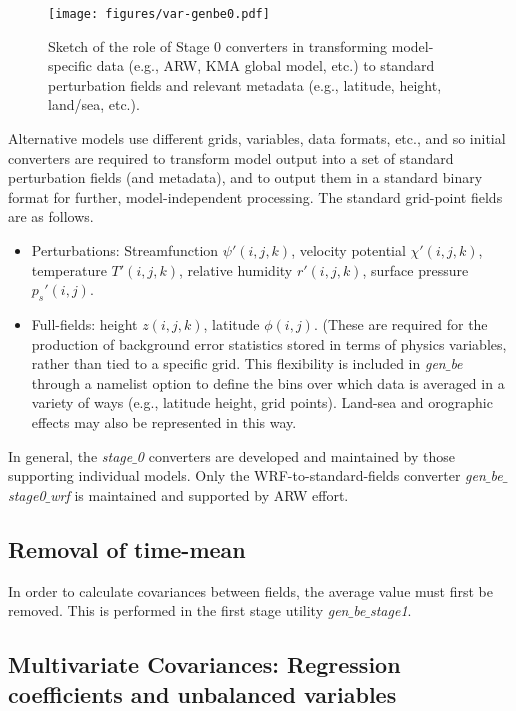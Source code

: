 %
%
\begin{figure}
  \centering
  \texttt{[image: figures/var-genbe0.pdf]}
  \caption{\label{var-genbe0}Sketch of the role of Stage 0 converters 
  in transforming model-specific data (e.g., ARW, KMA global model, etc.) to standard 
  perturbation fields and relevant metadata (e.g., latitude, height, land/sea, etc.).}
\end{figure}

Alternative models use different grids, variables, data formats, etc., and so initial converters 
are required to transform model output into a set of standard perturbation fields (and metadata), 
and to output them in a standard binary format for further, model-independent processing. The 
standard grid-point fields are as follows.

\begin{itemize}\setlength{\parskip}{-4pt}
\item
 	Perturbations: Streamfunction $\psi'(i,j,k)$, velocity potential $\chi'(i,j,k)$, 
temperature $T'(i,j,k)$, relative humidity $r'(i,j,k)$, surface pressure $p_s'(i,j)$.

\item
 	Full-fields: height $z(i,j,k)$, latitude $\phi(i,j)$. (These are required for the 
production of background error statistics stored in terms of physics variables, 
rather than tied to a specific grid. This flexibility is included in {\it gen$\_$be} through a 
namelist option to define the bins over which data is averaged in a variety of ways 
(e.g., latitude height, grid points). Land-sea and orographic effects may also be 
represented in this way.
\end{itemize}

In general, the {\it stage$\_$0} converters are developed and maintained by those supporting
individual models. Only the WRF-to-standard-fields converter {\it gen$\_$be$\_$stage0$\_$wrf} 
is maintained and supported by ARW effort.

\subsection{Removal of time-mean}

In order to calculate covariances between fields, the average value must first be removed. 
This is performed in the first stage utility {\it gen$\_$be$\_$stage1}. 

\subsection{Multivariate Covariances: Regression coefficients and unbalanced variables}


